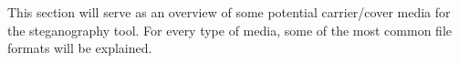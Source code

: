 This section will serve as an overview of some potential carrier/cover media for the steganography tool. For every type of media, some of the most common file formats will be explained.